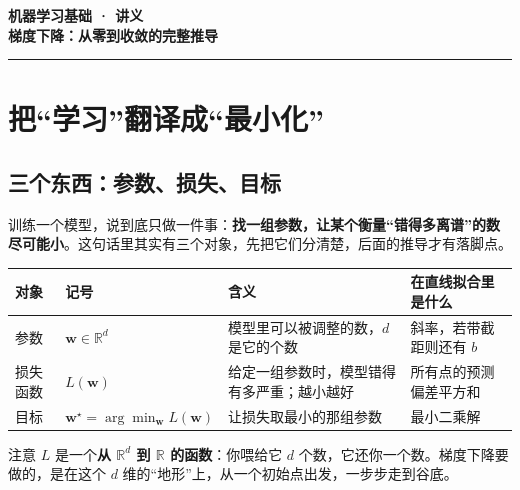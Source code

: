 \documentclass[UTF8, a4paper, zihao=-4, fontset=none]{ctexart}
\begin{document}
\begin{center}
{\sffamily\small\color{accent}\bfseries 机器学习基础 · 讲义}\\[6pt]
{\Huge\bfseries 梯度下降：从零到收敛的完整推导}\\[4pt]
{\color{rulegray}\rule{0.55\linewidth}{0.6pt}}
\end{center}
\vspace{1.2em}

\tableofcontents
\newpage





\section{把“学习”翻译成“最小化”}




\subsection{三个东西：参数、损失、目标}



训练一个模型，说到底只做一件事：\textbf{找一组参数，让某个衡量“错得多离谱”的数尽可能小}。这句话里其实有三个对象，先把它们分清楚，后面的推导才有落脚点。



\begin{center}
\footnotesize
\setlength{\tabcolsep}{3pt}
\begin{tabularx}{\linewidth}{@{}>{\hsize=0.545\hsize\raggedright\arraybackslash}X>{\hsize=0.545\hsize\raggedright\arraybackslash}X>{\hsize=1.778\hsize\raggedright\arraybackslash}X>{\hsize=1.132\hsize\raggedright\arraybackslash}X@{}}
\toprule
\textbf{对象} & \textbf{记号} & \textbf{含义} & \textbf{在直线拟合里是什么} \\
\midrule
参数 & $\mathbf{w}\in\mathbb{R}^d$ & 模型里可以被调整的数，$d$ 是它的个数 & 斜率，若带截距则还有 $b$ \\
损失函数 & $L(\mathbf{w})$ & 给定一组参数时，模型错得有多严重；越小越好 & 所有点的预测偏差平方和 \\
目标 & $\mathbf{w}^\star=\arg\min_{\mathbf{w}} L(\mathbf{w})$ & 让损失取最小的那组参数 & 最小二乘解 \\
\bottomrule
\end{tabularx}
\end{center}



注意 $L$ 是一个\textbf{从 $\mathbb{R}^d$ 到 $\mathbb{R}$ 的函数}：你喂给它 $d$ 个数，它还你一个数。梯度下降要做的，是在这个 $d$ 维的“地形”上，从一个初始点出发，一步步走到谷底。
\end{document}

